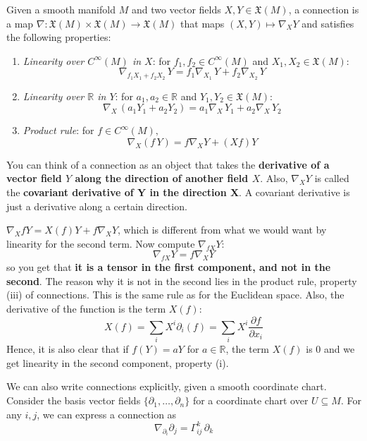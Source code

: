 \documentclass[a4paper,12pt,reqno]{amsbook}
\theoremstyle{definition} %
\newcommand{\1}{\mathbbm{1}}
\newcommand{\R}{\ensuremath{\mathbb{R}}}
\theoremstyle{plain}
\theoremstyle{remark}
\begin{document}
\begin{definition}[Connections]
    Given a smooth manifold $M$ and two vector fields $X,Y \in \mathfrak{X}(M)$, a connection is a map $\nabla:\mathfrak{X}(M) \times \mathfrak{X}(M) \to \mathfrak{X}(M)$ that maps $(X,Y) \mapsto \nabla_XY$ and satisfies the following properties:
    \begin{enumerate}[label=($\roman*$)]
        \item  \emph{Linearity over $C^\infty(M)$ in $X$}: for $f_1, f_2 \in C^\infty(M)$ and $X_1,X_2 \in \mathfrak{X}(M)$:
        \[\nabla_{f_1X_1 + f_2X_2}\,Y=f_1\nabla_{X_1}\,Y + f_2 \nabla_{X_2}\,Y\]
        \item \emph{Linearity over $\mathbb{R}$ in $Y$}: for $a_1, a_2 \in \mathbb{R}$ and $Y_1,Y_2 \in \mathfrak{X}(M)$:
        \[\nabla_{X}\,(a_1Y_1+a_2Y_2)=a_1\nabla_{X}\,Y_1 + a_2 \nabla_{X}\,Y_2\]
        \item \emph{Product rule}: for $f \in C^\infty(M),$\[\nabla_X(f\,Y)=f\nabla_XY+(Xf)Y\]
    \end{enumerate}
\end{definition}

You can think of a connection as an object that takes the \textbf{derivative of a vector field $Y$ along the direction of another field $X$}. Also, $\nabla_X Y$ is called the \textbf{covariant derivative of Y in the direction X}. A covariant derivative is just a derivative along a certain direction. 

\begin{remark}
$\nabla_X fY = X(f)Y + f\nabla_X Y$, which is different from what we would want by linearity for the second term. Now compute $\nabla_{fX} Y $:
\[
\nabla_{fX} Y = f\nabla_X Y
\]
so you get that \textbf{it is a tensor in the first component, and not in the second}. The reason why it is not in the second lies in the product rule, property (iii) of connections. This is the same rule as for the Euclidean space. Also, the derivative of the function is the term $X(f)$:
\[
X(f) = \sum_i X^i \partial_i (f) = \sum_i X^i  \frac{\partial f}{\partial x_i}
\]
Hence, it is also clear that if $f(Y) = aY$ for $a \in \R$, the term $X(f)$ is 0 and we get linearity in the second component, property (i). 
\end{remark}

We can also write connections explicitly, given a smooth coordinate chart. Consider the basis vector fields $\{\partial_1,\ldots,\partial_n\}$ for a coordinate chart over $U\subseteq M$. For any $i,j$, we can express a connection as
\[
\nabla_{\partial_i}\partial_j = \Gamma^k_{ij} \, \partial_k
\]
\end{document}

